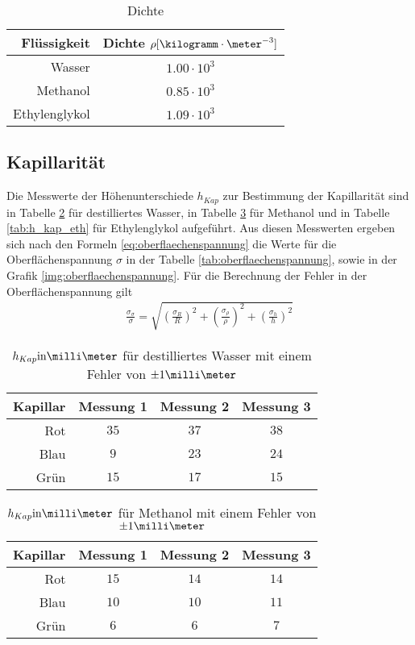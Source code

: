 \documentclass[12pt, a4paper, twoside]{scrartcl}
\begin{document}
\begin{table}[!h]
\centering
\begin{tabular}{r|c}
    Flüssigkeit & Dichte $\rho [\kilogramm\cdot\meter^{-3}]$\\
    \hline
    Wasser & $1.00\cdot 10^{3}$\\
    \hline
    Methanol & $ 0.85\cdot 10^{3}$\\
    \hline
    Ethylenglykol & $ 1.09 \cdot 10^{3}$\\
    
 \end{tabular} 
 \caption{\label{tab:dichte}Dichte}
\end{table}

\subsection{Kapillarität}

Die Messwerte der Höhenunterschiede $h_{Kap}$ zur Bestimmung der Kapillarität sind in Tabelle \ref{tab:h_kap_was} für destilliertes Wasser, in Tabelle \ref{tab:h_kap_met} für Methanol und in Tabelle \ref{tab:h_kap_eth} für Ethylenglykol aufgeführt.
Aus diesen Messwerten ergeben sich nach den Formeln \eqref{eq:oberflaechenspannung} die Werte für die Oberflächenspannung $\sigma$  in der Tabelle \ref{tab:oberflaechenspannung}, sowie in der Grafik \ref{img:oberflaechenspannung}.
Für die Berechnung der Fehler in der Oberflächenspannung gilt
\begin{align}
  \frac{\sigma_\sigma}{\sigma} = \sqrt{\left(\frac{\sigma_{R}}{R}\right)^2 + \left(\frac{\sigma_{\rho}}{\rho}\right) ^2 + \left(\frac{\sigma_{h}}{h}\right)^2} 
\end{align}

\begin{table}
\centering
\begin{tabular}{r|c|c|c}
    Kapillar & Messung 1 & Messung 2 & Messung 3\\
    \hline
    Rot & $35$ & $37$ & $38$ \\
    Blau & $9$ & $23$ & $24$ \\
    Grün & $15$ & $17$ & $15$ \\
    
 \end{tabular} 
 \caption{\label{tab:h_kap_was}$h_{Kap} \rm{in} \milli\meter$ für destilliertes Wasser mit einem Fehler von $\pm 1\milli\meter$}
\end{table}

\begin{table}
\centering
\begin{tabular}{r|c|c|c}
    Kapillar & Messung 1 & Messung 2 & Messung 3\\
    \hline
    Rot & $15$ & $14$ & $14$\\
    Blau & $10$ & $10$ & $11$ \\
    Grün & $6$ & $6$ & $7$\\
    
 \end{tabular} 
 \caption{\label{tab:h_kap_met}$h_{Kap} \rm{in} \milli\meter$ für Methanol mit einem Fehler von $\pm 1\milli\meter$}
\end{table}
\end{document}
